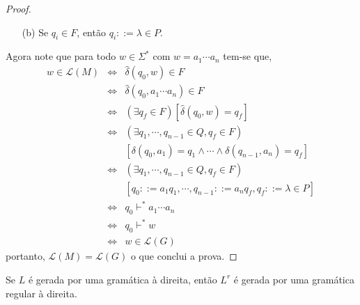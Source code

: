 \begin{proof}
\begin{itemize}
		\item[(b)] Se $q_i \in F$, então $q_i ::= \lambda \in P$.
	\end{itemize} 
	Agora note que para todo $w \in \Sigma^*$ com $w = a_1 \cdots a_n$ tem-se que, 
	\begin{eqnarray*}
		w \in \mathcal{L}(M) & \Longleftrightarrow & \widehat{\delta}(q_0, w) \in F\\
		& \Longleftrightarrow & \widehat{\delta}(q_0, a_1 \cdots a_n) \in F\\
		& \Longleftrightarrow & (\exists q_f \in F)[\widehat{\delta}(q_0, w) = q_f]\\
		& \Longleftrightarrow & (\exists q_1, \cdots, q_{n-1} \in Q,  q_f \in F)\\
		& & [\delta(q_0, a_1) = q_1 \land \cdots \land \delta(q_{n-1}, a_n) = q_f]\\
		& \Longleftrightarrow & (\exists q_1, \cdots, q_{n-1} \in Q,  q_f \in F)\\
		& & [q_0 ::= a_1q_1, \cdots, q_{n-1} ::= a_nq_f, q_f ::= \lambda \in P]\\
		& \Longleftrightarrow & q_0 \vdash^* a_1 \cdots a_n\\
		& \Longleftrightarrow & q_0 \vdash^* w\\
		& \Longleftrightarrow & w \in \mathcal{L}(G)
	\end{eqnarray*} 
	portanto, $\mathcal{L}(M) = \mathcal{L}(G)$ o que conclui a prova.
\end{proof}

\begin{lema}\label{lema:GRD-Reversa}
	Se $L$ é gerada por uma gramática à direita, então $L^r$ é gerada por uma gramática regular à direita.
\end{lema}

